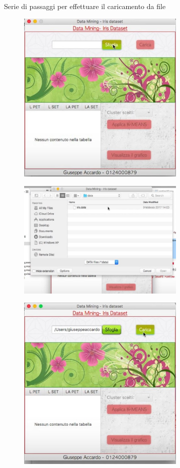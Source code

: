 \documentclass[a4paper, oneside]{book}
\begin{document}
Serie di passaggi per effettuare il caricamento da file
\begin{figure}[htp]
\centering
\includegraphics[width=8cm]{2.bmp}
\end{figure}
 
 \begin{figure}[htp]
\centering
\includegraphics[width=8cm]{3.bmp}
\end{figure}

\begin{figure}[htp]
\centering
\includegraphics[width=8cm]{4.bmp}
\end{figure}
\end{document}
